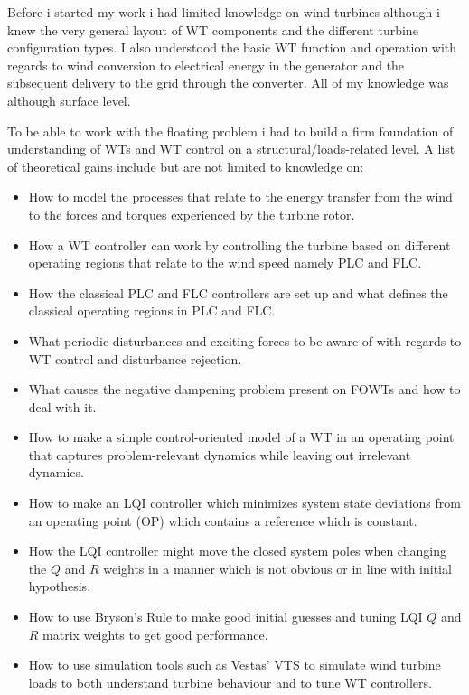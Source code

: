 \smallskip
Before i started my work i had limited knowledge on wind turbines although i knew the very general layout of WT components and the different turbine configuration types. I also understood the basic WT function and operation with regards to wind conversion to electrical energy in the generator and the subsequent delivery to the grid through the converter. All of my knowledge was although surface level.

To be able to work with the floating problem i had to build a firm foundation of understanding of WTs and WT control on a structural/loads-related level. A list of theoretical gains include but are not limited to knowledge on:
\begin{itemize}
	\item How to model the processes that relate to the energy transfer from the wind to the forces and torques experienced by the turbine rotor.
	\item How a WT controller can work by controlling the turbine based on different operating regions that relate to the wind speed namely PLC and FLC.
	\item How the classical PLC and FLC controllers are set up and what defines the classical operating regions in PLC and FLC.
	\item What periodic disturbances and exciting forces to be aware of with regards to WT control and disturbance rejection.
	\item What causes the negative dampening problem present on FOWTs and how to deal with it.
	\item How to make a simple control-oriented model of a WT in an operating point that captures problem-relevant dynamics while leaving out irrelevant dynamics.
	\item How to make an LQI controller which minimizes system state deviations from an operating point (OP) which contains a reference which is constant.
	\item How the LQI controller might move the closed system poles when changing the $ Q $ and $ R $ weights in a manner which is not obvious or in line with initial hypothesis.
	\item How to use Bryson's Rule to make good initial guesses and tuning LQI $ Q $ and $ R $ matrix weights to get good performance.
	\item How to use simulation tools such as Vestas' VTS to simulate wind turbine loads to both understand turbine behaviour and to tune WT controllers.
\end{itemize}

